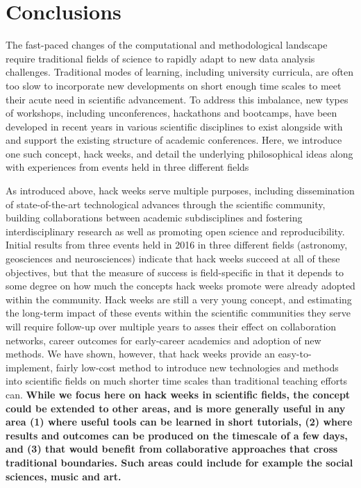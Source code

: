 
\section*{Conclusions}

The fast-paced changes of the computational and methodological landscape require traditional fields of science to rapidly adapt to new data analysis challenges.
Traditional modes of learning, including university curricula, are often too slow to incorporate new developments on short enough time scales to meet their acute need in scientific advancement.
To address this imbalance, new types of workshops, including unconferences, hackathons and bootcamps, have been developed in recent years in various scientific disciplines to exist alongside with and support the existing structure of academic conferences.
Here, we introduce one such concept, hack weeks, and detail the underlying philosophical ideas along with experiences from events held in three different fields

As introduced above, hack weeks serve multiple purposes, including dissemination of state-of-the-art technological advances through the scientific community, building collaborations between academic subdisciplines and fostering interdisciplinary research as well as  promoting open science and reproducibility.
Initial results from three events held in 2016 in three different fields (astronomy, geosciences and neurosciences) indicate that hack weeks succeed at all of these objectives, but that the measure of success is field-specific in that it depends to some degree on how much the concepts hack weeks promote were already adopted within the community.
Hack weeks are still a very young concept, and estimating the long-term impact of these events within the scientific communities they serve will require follow-up over multiple years to asses their effect on collaboration networks, career outcomes for early-career academics and adoption of new methods.
We have shown, however, that hack weeks provide an easy-to-implement, fairly low-cost method to introduce new technologies and methods into scientific fields on much shorter time scales than traditional teaching efforts can.
\textbf{While we focus here on hack weeks in scientific fields, the concept could be extended to other areas, and is more generally useful in any area (1) where useful tools can be learned in short tutorials, (2) where results and outcomes can be produced on the timescale of a few days, and (3) that would benefit from collaborative approaches that cross traditional boundaries. Such areas could include for example the social sciences, music and art.}